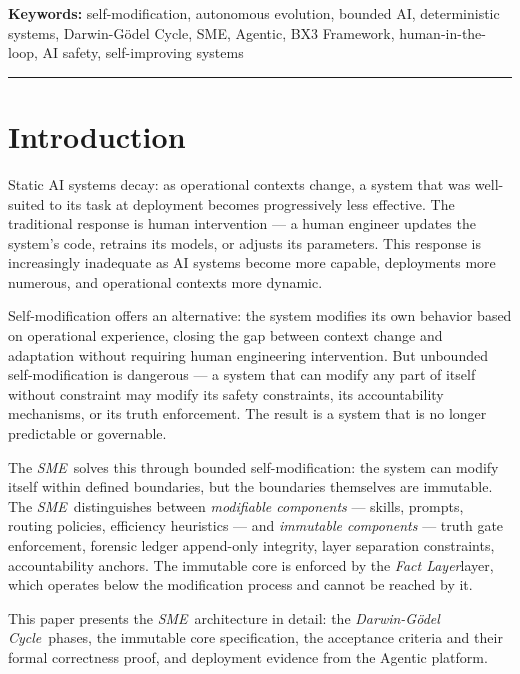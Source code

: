 \documentclass[12pt]{article}
\newcommand{\fact}{\textit{Fact Layer}}
\newcommand{\sme}{\textit{SME}}
\newcommand{\dgcycle}{\textit{Darwin-G\"odel Cycle}}
\begin{document}
\vspace{0.5em}
\noindent\textbf{Keywords:} self-modification, autonomous evolution, bounded AI, deterministic systems, Darwin-G\"odel Cycle, SME, Agentic, BX3 Framework, human-in-the-loop, AI safety, self-improving systems

\vspace{1em}
\hrule
\vspace{1em}

\onehalfspacing

\section{Introduction}
\label{sec:intro}

Static AI systems decay: as operational contexts change, a system that was well-suited to its task at deployment becomes progressively less effective. The traditional response is human intervention — a human engineer updates the system's code, retrains its models, or adjusts its parameters. This response is increasingly inadequate as AI systems become more capable, deployments more numerous, and operational contexts more dynamic.

Self-modification offers an alternative: the system modifies its own behavior based on operational experience, closing the gap between context change and adaptation without requiring human engineering intervention. But unbounded self-modification is dangerous — a system that can modify any part of itself without constraint may modify its safety constraints, its accountability mechanisms, or its truth enforcement. The result is a system that is no longer predictable or governable.

The \sme\ solves this through bounded self-modification: the system can modify itself within defined boundaries, but the boundaries themselves are immutable. The \sme\ distinguishes between \textit{modifiable components} — skills, prompts, routing policies, efficiency heuristics — and \textit{immutable components} — truth gate enforcement, forensic ledger append-only integrity, layer separation constraints, accountability anchors. The immutable core is enforced by the \fact layer, which operates below the modification process and cannot be reached by it.

This paper presents the \sme\ architecture in detail: the \dgcycle\ phases, the immutable core specification, the acceptance criteria and their formal correctness proof, and deployment evidence from the Agentic platform.
\end{document}
